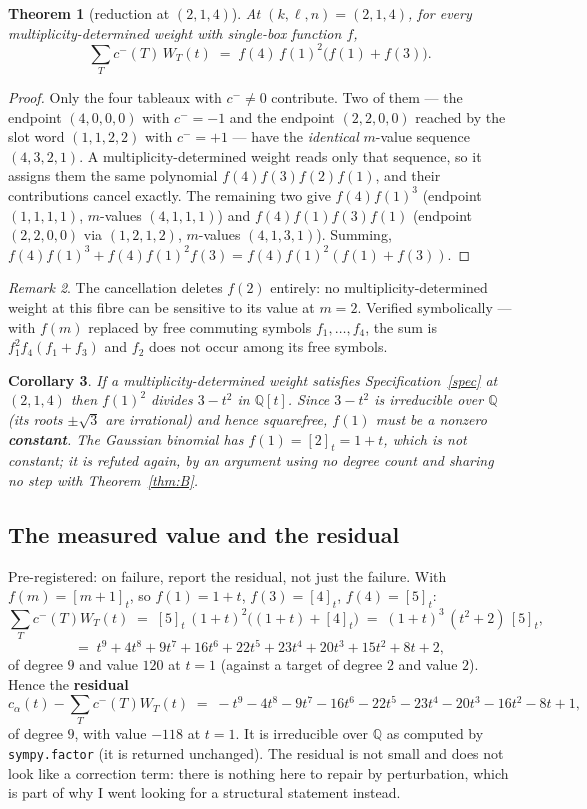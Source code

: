 \documentclass[11pt]{article}
\theoremstyle{plain}
\newtheorem{theorem}{Theorem}
\newtheorem{corollary}[theorem]{Corollary}
\theoremstyle{definition}
\theoremstyle{remark}
\newtheorem{remark}[theorem]{Remark}
\newcommand{\cm}{c^{-}}
\newcommand{\qbin}[1]{[#1]_t}
\begin{document}
\begin{theorem}[reduction at $(2,1,4)$]\label{thm:C}
At $(k,\ell,n)=(2,1,4)$, for every multiplicity-determined weight with single-box function
$f$,
\[
\sum_{T}\cm(T)\,W_T(t)\;=\;f(4)\,f(1)^2\bigl(f(1)+f(3)\bigr).
\]
\end{theorem}

\begin{proof}
Only the four tableaux with $\cm\neq0$ contribute. Two of them --- the endpoint $(4,0,0,0)$
with $\cm=-1$ and the endpoint $(2,2,0,0)$ reached by the slot word $(1,1,2,2)$ with
$\cm=+1$ --- have the \emph{identical} $m$-value sequence $(4,3,2,1)$. A
multiplicity-determined weight reads only that sequence, so it assigns them the same
polynomial $f(4)f(3)f(2)f(1)$, and their contributions cancel exactly. The remaining two
give $f(4)f(1)^3$ (endpoint $(1,1,1,1)$, $m$-values $(4,1,1,1)$) and $f(4)f(1)f(3)f(1)$
(endpoint $(2,2,0,0)$ via $(1,2,1,2)$, $m$-values $(4,1,3,1)$). Summing,
$f(4)f(1)^3+f(4)f(1)^2f(3)=f(4)f(1)^2(f(1)+f(3))$.
\end{proof}

\begin{remark}
The cancellation deletes $f(2)$ entirely: no multiplicity-determined weight at this fibre
can be sensitive to its value at $m=2$. Verified symbolically --- with $f(m)$ replaced by
free commuting symbols $f_1,\dots,f_4$, the sum is $f_1^2f_4(f_1+f_3)$ and $f_2$ does not
occur among its free symbols.
\end{remark}

\begin{corollary}\label{cor:squarefree}
If a multiplicity-determined weight satisfies Specification~\ref{spec} at $(2,1,4)$ then
$f(1)^2$ divides $3-t^2$ in $\mathbb{Q}[t]$. Since $3-t^2$ is irreducible over
$\mathbb{Q}$ (its roots $\pm\sqrt3$ are irrational) and hence squarefree, $f(1)$ must be a
nonzero \textbf{constant}. The Gaussian binomial has $f(1)=\qbin{2}=1+t$, which is not
constant; it is refuted again, by an argument using no degree count and sharing no step
with Theorem~\ref{thm:B}.
\end{corollary}

\subsection{The measured value and the residual}

Pre-registered: on failure, report the residual, not just the failure. With
$f(m)=\qbin{m+1}$, so $f(1)=1+t$, $f(3)=\qbin4$, $f(4)=\qbin5$:
\[
\sum_T\cm(T)W_T(t)\;=\;\qbin5\,(1+t)^2\bigl((1+t)+\qbin4\bigr)\;=\;(1+t)^3\,(t^2+2)\,\qbin5 ,
\]
\[
=\;t^{9}+4t^{8}+9t^{7}+16t^{6}+22t^{5}+23t^{4}+20t^{3}+15t^{2}+8t+2,
\]
of degree $9$ and value $120$ at $t=1$ (against a target of degree $2$ and value $2$).
Hence the \textbf{residual}
\[
c_\alpha(t)-\sum_T\cm(T)W_T(t)\;=\;
-t^{9}-4t^{8}-9t^{7}-16t^{6}-22t^{5}-23t^{4}-20t^{3}-16t^{2}-8t+1,
\]
of degree $9$, with value $-118$ at $t=1$. It is irreducible over $\mathbb{Q}$ as computed
by \texttt{sympy.factor} (it is returned unchanged). The residual is not small and does not
look like a correction term: there is nothing here to repair by perturbation, which is part
of why I went looking for a structural statement instead.
\end{document}

